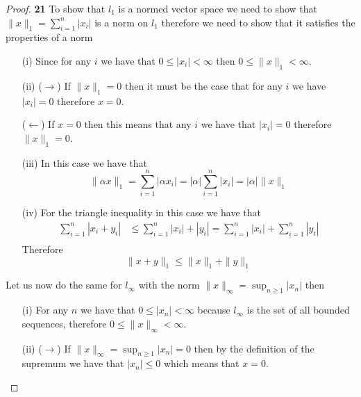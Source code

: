 \documentclass[11pt]{article}
\theoremstyle{definition}
\begin{document}
	\begin{proof}{\textbf{21}}
        To show that $l_1$ is a normed vector space we need to show that
        $\|x\|_1 = \sum_{i=1}^n |x_i|$ is a norm on $l_1$ therefore we need to show
        that it satisfies the properties of a norm
        \begin{itemize}
            \item [(i)] Since for any $i$ we have that $0 \leq |x_i| < \infty$ then
            $0 \leq \|x\|_1 < \infty$.
            \item [(ii)]
            ($\rightarrow$) If $\|x\|_1=0$ then it must be the case that for any $i$ we
            have $|x_i| = 0$ therefore $x=0$.
            
            ($\leftarrow$) If $x = 0$ then this means that any $i$ we have that
            $|x_i| = 0$ therefore $\|x\|_1=0$.
            \item [(iii)] In this case we have that
            $$\|\alpha x\|_1 = \sum_{i=1}^n |\alpha x_i| = |\alpha| \sum_{i=1}^n |x_i|
            = |\alpha| \|x\|_1$$
            \item [(iv)] For the triangle inequality in this case we have that
            \begin{align*}
                \sum_{i=1}^n |x_i + y_i| &\leq \sum_{i=1}^n |x_i| + |y_i|
                = \sum_{i=1}^n |x_i| + \sum_{i=1}^n |y_i|\\
            \end{align*}
            Therefore
            $$\|x+y\|_1 \leq \|x\|_1 + \|y\|_1$$
        \end{itemize}
        Let us now do the same for $l_\infty$ with the norm
        $\|x\|_\infty = \sup_{n\geq 1} |x_n|$ then
        \begin{itemize}
            \item [(i)] For any $n$ we have that $0 \leq |x_n| < \infty$ because
            $l_\infty$ is the set of all bounded sequences, therefore
            $0 \leq \|x\|_\infty < \infty$.
            \item [(ii)]
            ($\rightarrow$) If $\|x\|_\infty = \sup_{n\geq 1} |x_n| = 0$ then by the
            definition of the supremum we have that $|x_n| \leq 0$ which means that
            $x = 0$.


\end{itemize}
\end{proof}
\end{document}
